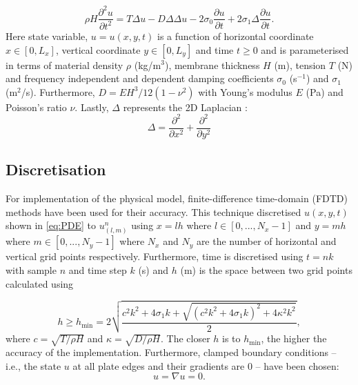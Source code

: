 \documentclass{vgtc}
\begin{document}
\begin{equation}
\rho H\frac{\partial^2u}{\partial t^2} = T\Delta u - D\Delta\Delta u - 2 \sigma_0\frac{\partial u}{\partial t} + 2 \sigma_1 \Delta \frac{\partial u}{\partial t}.
\end{equation}
Here state variable, $u = u(x,y,t)$ is a function of horizontal coordinate $x \in [0, L_x]$, vertical coordinate $y \in [0, L_y]$ and time $t\geq0$ and is parameterised in terms of material density $\rho$ (kg/m$^3$), membrane thickness $H$ (m), tension $T$ (N) and frequency independent and dependent damping coefficients $\sigma_0$ (s$^{-1}$) and $\sigma_1$ (m$^2$/s). Furthermore, $D = EH^3/12(1-\nu^2)$ with Young's modulus $E$ (Pa) and Poisson's ratio $\nu$. Lastly, $\Delta$ represents the 2D Laplacian \cite{bilbao2009numerical}:
\begin{equation}\label{eq:PDE}
    \Delta = \frac{\partial^2}{\partial x^2} + \frac{\partial^2}{\partial y^2}
\end{equation}

\subsection{Discretisation}
For implementation of the physical model, finite-difference time-domain (FDTD) methods have been used for their accuracy. This technique discretised $u(x,y,t)$ shown in \autoref{eq:PDE} to $u_{(l,m)}^n$ using $x=lh$ where $l \in [0, ..., N_x-1]$ and $y=mh$ where $m \in [0, ..., N_y-1]$ where $N_x$ and $N_y$ are the number of horizontal and vertical grid points respectively. Furthermore, time is discretised using $t = nk$ with sample $n$ and time step $k$ (s) and $h$ (m) is the space between two grid points calculated using 

\begin{equation}\label{eq:h}
    h \geq h_\text{min} =  2\sqrt{\frac{c^2k^2 + 4\sigma_1k + \sqrt{(c^2k^2 + 4\sigma_1k)^2 + 4\kappa^2 k^2} }{2}},
\end{equation}
where $c = \sqrt{T/\rho H}$ and $\kappa = \sqrt{D/\rho H}$. The closer $h$ is to $h_\text{min}$, the higher the accuracy of the implementation. Furthermore, clamped boundary conditions -- i.e., the state $u$ at all plate edges and their gradients are 0 -- have been chosen:
\begin{equation}
    u = \nabla u = 0.
\end{equation}
\\
\end{document}

